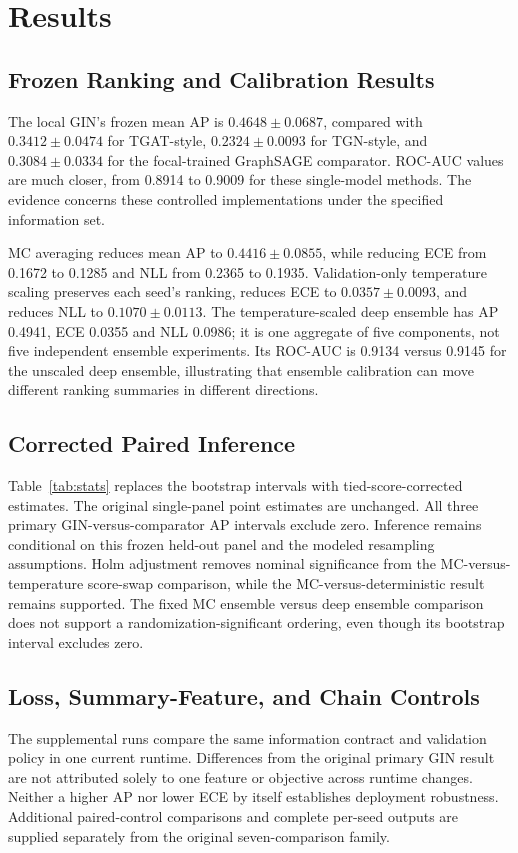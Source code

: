 \documentclass[applsci,article,submit,pdftex,moreauthors]{Definitions/mdpi}
\begin{document}
\section{Results}
\subsection{Frozen Ranking and Calibration Results}
The local GIN's frozen mean AP is $0.4648\pm0.0687$, compared with $0.3412\pm0.0474$ for TGAT-style, $0.2324\pm0.0093$ for TGN-style, and $0.3084\pm0.0334$ for the focal-trained GraphSAGE comparator. ROC-AUC values are much closer, from 0.8914 to 0.9009 for these single-model methods. The evidence concerns these controlled implementations under the specified information set.


MC averaging reduces mean AP to $0.4416\pm0.0855$, while reducing ECE from 0.1672 to 0.1285 and NLL from 0.2365 to 0.1935. Validation-only temperature scaling preserves each seed's ranking, reduces ECE to $0.0357\pm0.0093$, and reduces NLL to $0.1070\pm0.0113$. The temperature-scaled deep ensemble has AP 0.4941, ECE 0.0355 and NLL 0.0986; it is one aggregate of five components, not five independent ensemble experiments. Its ROC-AUC is 0.9134 versus 0.9145 for the unscaled deep ensemble, illustrating that ensemble calibration can move different ranking summaries in different directions.

\subsection{Corrected Paired Inference}
Table~\ref{tab:stats} replaces the bootstrap intervals with tied-score-corrected estimates. The original single-panel point estimates are unchanged. All three primary GIN-versus-comparator AP intervals exclude zero. Inference remains conditional on this frozen held-out panel and the modeled resampling assumptions. Holm adjustment removes nominal significance from the MC-versus-temperature score-swap comparison, while the MC-versus-deterministic result remains supported. The fixed MC ensemble versus deep ensemble comparison does not support a randomization-significant ordering, even though its bootstrap interval excludes zero.


\subsection{Loss, Summary-Feature, and Chain Controls}


The supplemental runs compare the same information contract and validation policy in one current runtime. Differences from the original primary GIN result are not attributed solely to one feature or objective across runtime changes. Neither a higher AP nor lower ECE by itself establishes deployment robustness. Additional paired-control comparisons and complete per-seed outputs are supplied separately from the original seven-comparison family.
\end{document}
